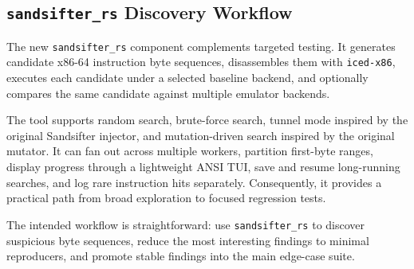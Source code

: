 \subsection{\texttt{sandsifter\_rs} Discovery Workflow}

The new \texttt{sandsifter\_rs} component complements targeted testing. It generates candidate x86-64 instruction byte sequences, disassembles them with \texttt{iced-x86}, executes each candidate under a selected baseline backend, and optionally compares the same candidate against multiple emulator backends.

The tool supports random search, brute-force search, tunnel mode inspired by the original Sandsifter injector, and mutation-driven search inspired by the original mutator. It can fan out across multiple workers, partition first-byte ranges, display progress through a lightweight ANSI TUI, save and resume long-running searches, and log rare instruction hits separately. Consequently, it provides a practical path from broad exploration to focused regression tests.

The intended workflow is straightforward: use \texttt{sandsifter\_rs} to discover suspicious byte sequences, reduce the most interesting findings to minimal reproducers, and promote stable findings into the main edge-case suite.
